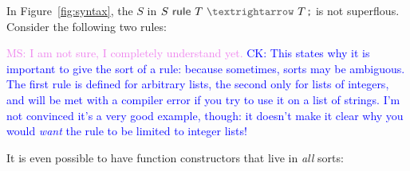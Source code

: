 \documentclass[letterpaper,11pt]{article}
\newcommand{\CK}[1]{\textcolor{blue}{CK: #1}}
\newcommand{\MS}[1]{\textcolor{violet}{MS: #1}}
\begin{document}
In Figure~\ref{fig:syntax}, the $S$ in $S~\kw{rule}~T~\kw{$→$}~T\,\kw;$ is not superflous. Consider
the following two rules:
\MS{I am not sure, I completely understand yet.}
\CK{This states why it is important to give the sort of a rule: because
sometimes, sorts may be ambiguous.  The first rule is defined for arbitrary
lists, the second only for lists of integers, and will be met with a
compiler error if you try to use it on a list of strings.  I'm not convinced
it's a very good example, though: it doesn't make it clear why you would
\emph{want} the rule to be limited to integer lists!}

It is even possible to have function constructors that live in \emph{all} sorts:
\end{document}

